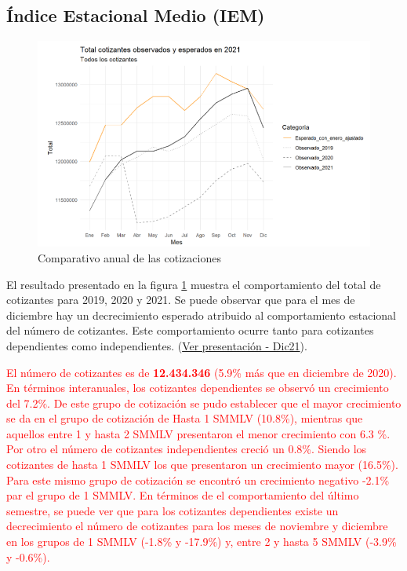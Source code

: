 \subsection{Índice Estacional Medio (IEM)}

\begin{figure}
\includegraphics[width = 12.5cm]{figures/01_dinamica/serie_contraste.png}
\caption{Comparativo anual de las cotizaciones}
\label{figura:IEM_Total}
\end{figure}

El resultado presentado en la figura \ref{figura:IEM_Total} muestra el comportamiento del total de cotizantes para 2019, 2020 y 2021. Se puede observar que para el mes de diciembre hay un decrecimiento esperado atribuido al comportamiento estacional del número de cotizantes. Este comportamiento ocurre tanto para cotizantes dependientes como independientes. (\href{https://www.ugpp.gov.co/Evolucion-cotizaciones-Sistema-Proteccion-Social}{Ver presentación - Dic21}). 


\textcolor{red}{
El número de cotizantes es de \textbf{12.434.346} (5.9\% más que en diciembre de 2020). En términos interanuales, los cotizantes dependientes se observó un crecimiento del 7.2\%. De este grupo de cotización se pudo establecer que el mayor crecimiento se da en el grupo de cotización de Hasta 1 SMMLV (10.8\%), mientras que aquellos entre 1 y hasta 2 SMMLV presentaron el menor crecimiento con 6.3 \%. Por otro el número de cotizantes independientes creció un 0.8\%. Siendo los cotizantes de hasta 1 SMMLV los que presentaron un crecimiento mayor (16.5\%). Para este mismo grupo de cotización se encontró un crecimiento negativo -2.1\% par el grupo de 1 SMMLV. 
En términos de el comportamiento del último semestre, se puede ver que para los cotizantes dependientes existe un decrecimiento el número de cotizantes para los meses de noviembre y diciembre en los grupos de 1 SMMLV (-1.8\% y -17.9\%) y, entre 2 y hasta 5 SMMLV (-3.9\% y -0.6\%). }


